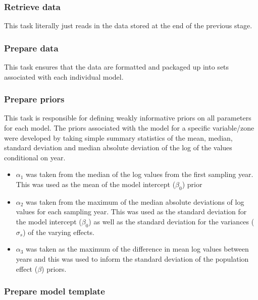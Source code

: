 \documentclass[
  8pt,
  a4paper]{article}
\providecommand{\tightlist}{%
  \setlength{\itemsep}{0pt}\setlength{\parskip}{0pt}}
\begin{document}
\subsubsection{Retrieve data}\label{retrieve-data-1}

This task literally just reads in the data stored at the end of the
previous stage.

\subsubsection{Prepare data}\label{prepare-data}

This task ensures that the data are formatted and packaged up into sets
associated with each individual model.

\subsubsection{Prepare priors}\label{prepare-priors}

This task is responsible for defining weakly informative priors on all
parameters for each model. The priors associated with the model for a
specific variable/zone were developed by taking simple summary
statistics of the mean, median, standard deviation and median absolute
deviation of the log of the values conditional on year.

\begin{itemize}
\tightlist
\item
  \(\alpha_1\) was taken from the median of the log values from the
  first sampling year. This was used as the mean of the model intercept
  (\(\beta_0\)) prior
\item
  \(\alpha_2\) was taken from the maximum of the median absolute
  deviations of log values for each sampling year. This was used as the
  standard deviation for the model intercept (\(\beta_0\)) as well as
  the standard deviation for the variances (\(\sigma_s\)) of the varying
  effects.
\item
  \(\alpha_3\) was taken as the maximum of the difference in mean log
  values between years and this was used to inform the standard
  deviation of the population effect (\(\beta\)) priors.
\end{itemize}

\subsubsection{Prepare model template}\label{prepare-model-template}
\end{document}
